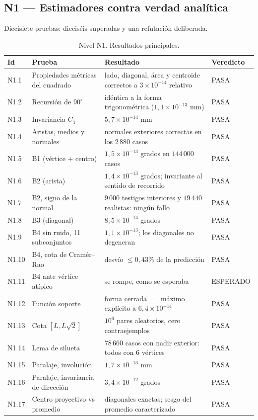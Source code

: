 \documentclass[11pt,a4paper]{article}
\newcommand{\grados}{^{\circ}}
\newcommand{\PASA}{\cellcolor{ok}\textsf{\footnotesize PASA}}
\newcommand{\ESPER}{\cellcolor{inf}\textsf{\footnotesize ESPERADO}}
\begin{document}
\subsection{N1 --- Estimadores contra verdad analítica}

Diecisiete pruebas: dieciséis superadas y una refutación deliberada.

\begin{table}[htbp]
\centering
\small
\caption{Nivel N1. Resultados principales.}
\begin{tabular}{llp{7.0cm}l}
\toprule
Id & Prueba & Resultado & Veredicto \\
\midrule
N1.1 & Propiedades métricas del cuadrado & lado, diagonal, área y centroide correctos a $3\times10^{-14}$ relativo & \PASA \\
N1.2 & Recursión de $90\grados$ & idéntica a la forma trigonométrica ($1{,}1\times10^{-13}$ mm) & \PASA \\
N1.3 & Invariancia $C_4$ & $5{,}7\times10^{-14}$ mm & \PASA \\
N1.4 & Aristas, medios y normales & normales exteriores correctas en los $2\,880$ casos & \PASA \\
N1.5 & B1 (vértice + centro) & $1{,}5\times10^{-13}$ grados en $144\,000$ casos & \PASA \\
N1.6 & B2 (arista) & $1{,}4\times10^{-13}$ grados; invariante al sentido de recorrido & \PASA \\
N1.7 & B2, signo de la normal & $9\,000$ testigos interiores y $19\,440$ realistas: ningún fallo & \PASA \\
N1.8 & B3 (diagonal) & $8{,}5\times10^{-14}$ grados & \PASA \\
N1.9 & B4 sin ruido, 11 subconjuntos & $1{,}1\times10^{-13}$; los diagonales no degeneran & \PASA \\
N1.10 & B4, cota de Cramér--Rao & desvío $\le 0{,}43\%$ de la predicción & \PASA \\
N1.11 & B4 ante vértice atípico & se rompe, como se esperaba & \ESPER \\
N1.12 & Función soporte & forma cerrada $=$ máximo explícito a $6{,}4\times10^{-14}$ & \PASA \\
N1.13 & Cota $[L, L\sqrt2]$ & $10^6$ pares aleatorios, cero contraejemplos & \PASA \\
N1.14 & Lema de silueta & $78\,660$ casos con nadir exterior: todos con 6 vértices & \PASA \\
N1.15 & Paralaje, involución & $1{,}7\times10^{-13}$ mm & \PASA \\
N1.16 & Paralaje, invariancia de dirección & $3{,}4\times10^{-12}$ grados & \PASA \\
N1.17 & Centro proyectivo vs promedio & diagonales exactas; sesgo del promedio caracterizado & \PASA \\
\bottomrule
\end{tabular}
\end{table}
\end{document}
